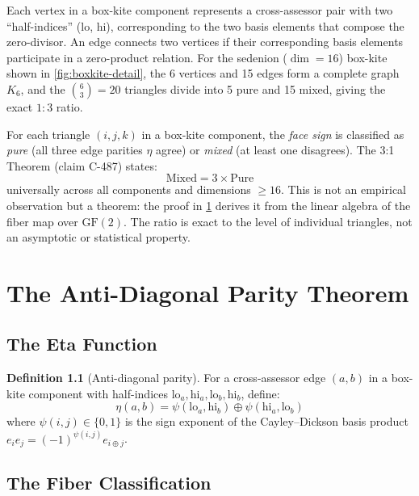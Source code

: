 \documentclass[12pt,openany]{report}
\theoremstyle{definition}
\newtheorem{definition}{Definition}[chapter]
\theoremstyle{plain}
\theoremstyle{remark}
\begin{document}
Each vertex in a box-kite component represents a cross-assessor pair
with two ``half-indices'' (lo, hi), corresponding to the two basis
elements that compose the zero-divisor.  An edge connects two vertices
if their corresponding basis elements participate in a zero-product
relation.  For the sedenion ($\dim = 16$) box-kite shown in
\cref{fig:boxkite-detail}, the 6 vertices and 15 edges form a complete
graph $K_6$, and the $\binom{6}{3} = 20$ triangles divide into 5 pure
and 15 mixed, giving the exact $1{:}3$ ratio.

For each triangle $(i,j,k)$ in a box-kite component, the \emph{face sign}
is classified as \emph{pure} (all three edge parities $\eta$ agree) or
\emph{mixed} (at least one disagrees).  The 3:1 Theorem (claim C-487)
states:
\begin{equation}
  \text{Mixed} = 3 \times \text{Pure}
  \label{eq:3to1}
\end{equation}
universally across all components and dimensions $\geq 16$.  This is
not an empirical observation but a theorem: the proof in \cref{ch:apt}
derives it from the linear algebra of the fiber map over $\mathrm{GF}(2)$.
The ratio is exact to the level of individual triangles, not an
asymptotic or statistical property.


\chapter{The Anti-Diagonal Parity Theorem}
\label{ch:apt}

\section{The Eta Function}
\label{sec:eta}

\begin{definition}[Anti-diagonal parity]
For a cross-assessor edge $(a,b)$ in a box-kite component with half-indices
$\mathrm{lo}_a, \mathrm{hi}_a, \mathrm{lo}_b, \mathrm{hi}_b$, define:
\begin{equation}
  \eta(a,b) = \psi(\mathrm{lo}_a, \mathrm{hi}_b)
              \oplus \psi(\mathrm{hi}_a, \mathrm{lo}_b)
  \label{eq:eta}
\end{equation}
where $\psi(i,j) \in \{0,1\}$ is the sign exponent of the Cayley--Dickson
basis product $e_i e_j = (-1)^{\psi(i,j)} e_{i \oplus j}$.
\end{definition}

\section{The Fiber Classification}
\label{sec:fiber}
\end{document}
